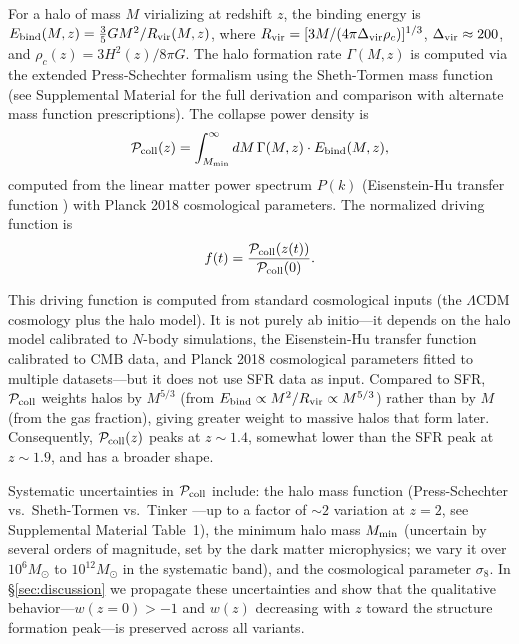 \documentclass[aps,prd,twocolumn,superscriptaddress]{revtex4-2}
\begin{document}
For a halo of mass $M$ virializing at redshift $z$, the binding energy is $E_{\rm bind}(M,z) = \frac{3}{5}GM^2/R_{\rm vir}(M,z)$, where $R_{\rm vir} = [3M/(4\pi\Delta_{\rm vir}\rho_c)]^{1/3}$, $\Delta_{\rm vir} \approx 200$, and $\rho_c(z) = 3H^2(z)/8\pi G$. The halo formation rate $\Gamma(M,z)$ is computed via the extended Press-Schechter formalism \cite{Lacey:1993,Sasaki:1994} using the Sheth-Tormen mass function \cite{Sheth:1999} (see Supplemental Material for the full derivation and comparison with alternate mass function prescriptions). The collapse power density is
\begin{equation}
\mathcal{P}_{\rm coll}(z) = \int_{M_{\rm min}}^{\infty} dM \, \Gamma(M,z) \cdot E_{\rm bind}(M,z),
\label{eq:pcoll}
\end{equation}
computed from the linear matter power spectrum $P(k)$ (Eisenstein-Hu transfer function \cite{Eisenstein:1998}) with Planck 2018 cosmological parameters. The normalized driving function is
\begin{equation}
f(t) = \frac{\mathcal{P}_{\rm coll}(z(t))}{\mathcal{P}_{\rm coll}(0)}.
\label{eq:fdrive}
\end{equation}

This driving function is computed from standard cosmological inputs (the $\Lambda$CDM cosmology plus the halo model). It is not purely ab initio---it depends on the halo model calibrated to $N$-body simulations, the Eisenstein-Hu transfer function calibrated to CMB data, and Planck 2018 cosmological parameters fitted to multiple datasets---but it does not use SFR data as input. Compared to SFR, $\mathcal{P}_{\rm coll}$ weights halos by $M^{5/3}$ (from $E_{\rm bind} \propto M^2/R_{\rm vir} \propto M^{5/3}$) rather than by $M$ (from the gas fraction), giving greater weight to massive halos that form later. Consequently, $\mathcal{P}_{\rm coll}(z)$ peaks at $z \sim 1.4$, somewhat lower than the SFR peak at $z \sim 1.9$, and has a broader shape.

Systematic uncertainties in $\mathcal{P}_{\rm coll}$ include: the halo mass function (Press-Schechter vs.\ Sheth-Tormen vs.\ Tinker \cite{Tinker:2008}---up to a factor of $\sim 2$ variation at $z=2$, see Supplemental Material Table~1), the minimum halo mass $M_{\rm min}$ (uncertain by several orders of magnitude, set by the dark matter microphysics; we vary it over $10^6 M_\odot$ to $10^{12} M_\odot$ in the systematic band), and the cosmological parameter $\sigma_8$. In \S\ref{sec:discussion} we propagate these uncertainties and show that the qualitative behavior---$w(z=0) > -1$ and $w(z)$ decreasing with $z$ toward the structure formation peak---is preserved across all variants.
\end{document}
